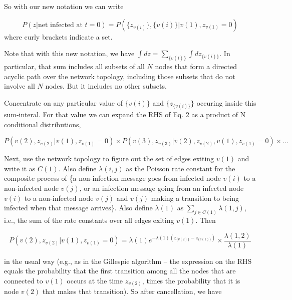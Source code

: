 \documentclass{article}
\begin{document}
	So with our new notation we can write

	\begin{equation}
	 P(z | \text{net infected at } t = 0) = P(\{z_{v(i)}\}, \{v(i)\} | v(1), z_{v(1)} = 0)
	\end{equation}
	where curly brackets indicate a set. 

	Note that with this new notation, we have $\int dz = \sum_{\{v(i)\}} \int dz_{\{v(i)\}}$.
	In particular, that sum includes all subsets of all $N$ nodes that form a directed 
        acyclic path over the network topology, including those subsets that do not involve all $N$
	nodes. But it includes no other subsets.  

	Concentrate on any particular value of $\{v(i)\}$ and $\{z_{\{v(i)\}}\}$ occuring
	inside this sum-interal. For that value we can expand the RHS of Eq. 2
	as a product of N conditional distributions,

	\begin{equation*}
		P(v(2), z_{v(2)} |  v(1), z_{v(1)} = 0)    \times  
		P(v(3), z_{v(3)} |  v(2), z_{v(2)}, v(1), z_{v(1)} = 0)    \times  \ldots
	\end{equation*}

	Next, use the network topology to figure out the set of edges exiting
	$v(1)$ and write it as $C(1)$. Also define $\lambda(i,j)$ as the Poisson rate
	constant for the composite process of \{a non-infection message goes
	from infected node $v(i)$ to a non-infected node $v(j)$, or an infection
	message going from an infected node $v(i)$ to a non-infected node $v(j)$
	and $v(j)$ making a transition to being infected when that message
	arrives\}.  Also define $\lambda(1)$ as $\sum_{j \in C(1)} \lambda(1,j)$,
	i.e., the sum of the rate constants over all edges exiting $v(1)$. Then

	\begin{equation*}
		P(v(2), z_{v(2)} | v(1), z_{v(1)} = 0)  =
		\lambda(1) e^{- \lambda(1) (z_{\{v(2)\}} - z_{\{v(1)\}})} 
		\times \frac{\lambda(1,2)}{\lambda(1)}
	\end{equation*}

	in the usual way (e.g., as in the Gillespie algorithm -- the
	expression on the RHS equals the probability that the first transition
	among all the nodes that are connected to $v(1)$ occurs at the time
	$z_{v(2)}$, times the probability that it is node $v(2)$ that makes that
	transition). So after cancellation, we have
	
\end{document}
